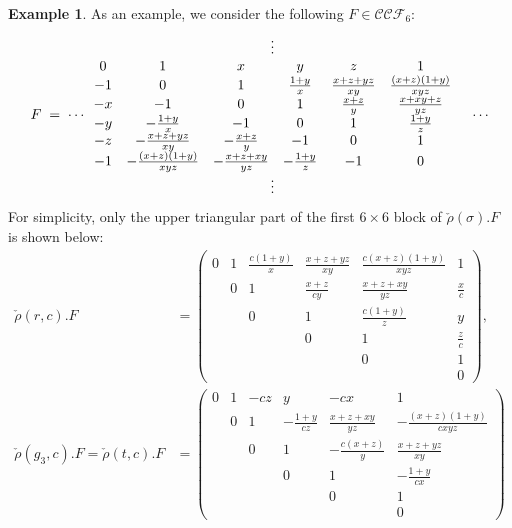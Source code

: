 \documentclass[11pt]{amsart}
\theoremstyle{plain}
\theoremstyle{definition}
\newtheorem{example}[proposition]{Example}
\theoremstyle{remark}
\begin{document}
\begin{example}
As an example, we consider the following $F\in\mathcal{CCF}_6$:
\begin{align*}
\begin{array}{c@{}cc}
& \vdots & \\
F\;=\;\cdots &
\begin{array}{cccccc}
            0 & 1 & x & y & z & 1 \\
            -1& 0 & 1 & \frac{1+y}{x} & \frac{x+z+yz}{xy} & \frac{(x+z)(1+y)}{xyz} \\
            -x&-1& 0 & 1 & \frac{x+z}{y} & \frac{x+xy+z}{yz} \\
            -y&-\frac{1+y}{x}&-1& 0 & 1 & \frac{1+y}{z} \\
            -z&-\frac{x+z+yz}{xy}&-\frac{x+z}{y}&-1& 0 & 1\\
        -1&-\frac{(x+z)(1+y)}{xyz}&-\frac{x+z+xy}{yz}&-\frac{1+y}{z}&-1& 0
\end{array}&\cdots\\
&\vdots&
\end{array}
\end{align*}
For simplicity, only the upper triangular part of the first $6 \times 6$ block
of $\check{\rho}(\sigma).F$ is shown below:
\begin{align*}
    \check{\rho}(r,c).F &= \begin{pmatrix}
            0 & 1 & \frac{c(1+y)}{x} & \frac{x+z+yz}{xy} & \frac{c(x+z)(1+y)}{xyz} & 1 \\
            & 0 & 1 & \frac{x+z}{cy} & \frac{x+z+xy}{yz} & \frac{x}{c} \\
            && 0 & 1 & \frac{c(1+y)}{z} & y \\
            &&& 0 & 1 & \frac{z}{c} \\
            &&&& 0 & 1\\
        &&&&& 0
        \end{pmatrix}, \\
    \check{\rho}(g_3, c).F = \check{\rho}(t, c).F &= \begin{pmatrix}
            0 & 1 & -cz & y & -cx & 1 \\
            & 0 & 1 & -\frac{1+y}{cz} & \frac{x+z+xy}{yz} & -\frac{(x+z)(1+y)}{cxyz} \\
            && 0 & 1 & -\frac{c(x+z)}{y} & \frac{x+z+yz}{xy} \\
            &&& 0 & 1 & -\frac{1+y}{cx} \\
            &&&& 0 & 1\\
        &&&&& 0

\end{pmatrix}
\end{align*}
\end{example}
\end{document}
